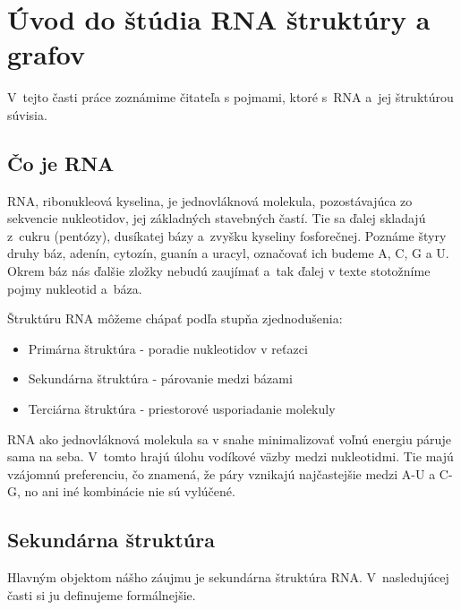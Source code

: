 \renewcommand{\SS}{\mathbb{S}}
\newcommand{\Par}[2]{\mbox{$( #1, #2 )$}}
\usetikzlibrary{positioning, shapes, trees, graphs} %
\newcommand{\scale}{0.6}

\newcommand{\tree}[1]{\ensuremath{#1}}

\chapter{Úvod do štúdia RNA štruktúry a grafov}

V~tejto časti práce zoznámime čitateľa s pojmami, ktoré s~RNA a~jej
štruktúrou súvisia.




\section{Čo je RNA}

RNA, ribonukleová kyselina, je jednovláknová molekula, pozostávajúca
zo sekvencie nukleotidov, jej základných stavebných častí.
Tie sa ďalej skladajú z~cukru (pentózy), dusíkatej bázy a~zvyšku
kyseliny fosforečnej. Poznáme štyry druhy báz,
adenín, cytozín, guanín a uracyl, označovať ich budeme A, C, G a U.
Okrem báz nás ďalšie zložky nebudú zaujímať a~tak ďalej v texte stotožníme
pojmy nukleotid a~báza.

Štruktúru RNA môžeme chápať podľa stupňa zjednodušenia:
\begin{itemize}
  \item Primárna štruktúra - poradie nukleotidov v reťazci
  \item Sekundárna štruktúra - párovanie medzi bázami
  \item Terciárna štruktúra - priestorové usporiadanie molekuly
\end{itemize}

RNA ako jednovláknová molekula sa v snahe minimalizovať voľnú energiu páruje sama na seba.
V~tomto hrajú úlohu vodíkové väzby medzi nukleotidmi. Tie majú vzájomnú preferenciu,
čo znamená, že páry vznikajú najčastejšie medzi A-U a C-G, no ani iné
kombinácie nie sú vylúčené. 




\section{Sekundárna štruktúra}

Hlavným objektom nášho záujmu je sekundárna štruktúra RNA. V~nasledujúcej
časti si ju definujeme formálnejšie.

